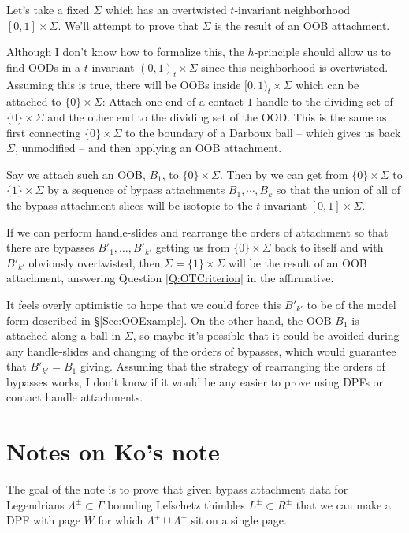 \documentclass[11pt]{amsart}
\newcommand{\Lag}{L}
\newcommand{\posNegLag}{\Lag^{\pm}}
\newcommand{\Leg}{\Lambda}
\newcommand{\posLeg}{\Leg^{+}}
\newcommand{\negLeg}{\Leg^{-}}
\newcommand{\posNegLeg}{\Leg^{\pm}}
\newcommand{\divSet}{\Gamma}
\begin{document}
Let's take a fixed $\Sigma$ which has an overtwisted $t$-invariant neighborhood $[0, 1] \times \Sigma$. We'll attempt to prove that $\Sigma$ is the result of an OOB attachment.

Although I don't know how to formalize this, the $h$-principle should allow us to find OODs in a $t$-invariant $(0, 1)_{t} \times \Sigma$ since this neighborhood is overtwisted. Assuming this is true, there will be OOBs inside $[0 ,1)_{t} \times \Sigma$ which can be attached to $\{ 0 \} \times \Sigma$: Attach one end of a contact $1$-handle to the dividing set of $\{ 0 \} \times \Sigma$ and the other end to the dividing set of the OOD. This is the same as first connecting $\{0\} \times \Sigma$ to the boundary of a Darboux ball -- which gives us back $\Sigma$, unmodified -- and then applying an OOB attachment.

Say we attach such an OOB, $B_{1}$, to $\{ 0 \} \times \Sigma$. Then by \cite[Theorem 1.2.5]{HH:Convex} we can get from $\{ 0 \} \times \Sigma$ to $\{ 1 \} \times \Sigma$ by a sequence of bypass attachments $B_{1}, \cdots, B_{k}$ so that the union of all of the bypass attachment slices will be isotopic to the $t$-invariant $[0, 1]\times \Sigma$.

If we can perform handle-slides and rearrange the orders of attachment so that there are bypasses $B'_{1}, \dots, B'_{k'}$ getting us from $\{ 0 \} \times \Sigma$ back to itself and with $B'_{k'}$ obviously overtwisted, then $\Sigma = \{ 1 \} \times \Sigma$ will be the result of an OOB attachment, answering Question \ref{Q:OTCriterion} in the affirmative.

It feels overly optimistic to hope that we could force this $B'_{k'}$ to be of the model form described in \S \ref{Sec:OOExample}. On the other hand, the OOB $B_{1}$ is attached along a ball in $\Sigma$, so maybe it's possible that it could be avoided during any handle-slides and changing of the orders of bypasses, which would guarantee that $B'_{k'} = B_{1}$ giving. Assuming that the strategy of rearranging the orders of bypasses works, I don't know if it would be any easier to prove using DPFs or contact handle attachments.

\section{Notes on Ko's note}\label{Sec:KoNote}

The goal of the note is to prove that given bypass attachment data for Legendrians $\posNegLeg \subset \divSet$ bounding Lefschetz thimbles $\posNegLag \subset R^{\pm}$ that we can make a DPF with page $W$ for which $\posLeg \cup \negLeg$ sit on a single page.
\end{document}
